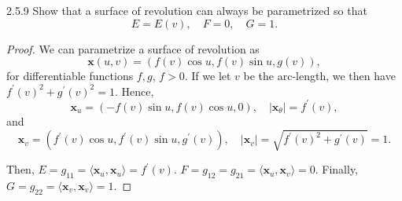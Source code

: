 \documentclass[11pt]{article}
\begin{document}
\begin{problem}{2.5.9}
	Show that a surface of revolution can always be parametrized so that
	\begin{equation}
		\label{eq:4}
		E = E(v), \quad F = 0, \quad G = 1.
	\end{equation}
\end{problem}
\begin{proof}
  We can parametrize a surface of revolution as
  \begin{equation}
  \label{eq:24}
  \mathbf{x}(u,v) = \left( f(v)\cos u, f(v)\sin u, g(v) \right),
\end{equation}
for differentiable functions \( f, g \), \( f > 0 \).
If we let \( v \) be the arc-length, we then have \( f^{\prime}(v)^2 + g^{\prime}(v)^2 = 1 \).
Hence,
\begin{equation}
\label{eq:25}
\mathbf{x}_{u} = (-f(v)\sin u, f(v) \cos u, 0), \quad |\mathbf{x}_{\theta}| = f^{\prime}(v),
\end{equation}
and
\begin{equation}
\label{eq:26}
\mathbf{x}_{v} = (f^{\prime}(v)\cos u, f^{\prime}(v)\sin u, g^{\prime}(v)), \quad |\mathbf{x}_v| = \sqrt{f^{\prime}(v)^2 + g^{\prime}(v)} = 1.
\end{equation}

Then, \( E = g_{11} = \langle \mathbf{x}_u, \mathbf{x}_u \rangle = f^{\prime}(v) \).
\( F = g_{12} = g_{21} = \langle \mathbf{x}_u, \mathbf{x}_v \rangle = 0 \).
Finally, \( G = g_{22} = \langle \mathbf{x}_v, \mathbf{x}_v \rangle = 1\).
\end{proof}
\end{document}
